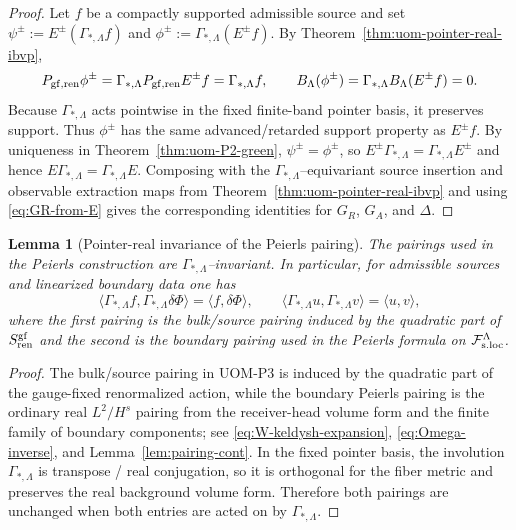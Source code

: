 \documentclass[10pt]{article}
\theoremstyle{definition}
\theoremstyle{plain}
\newtheorem{lemma}{Lemma}[section]
\begin{document}
\begin{proof}
Let $f$ be a compactly supported admissible source and set
\(
\psi^\pm:=E^\pm(\Gamma_{*,\Lambda}f)
\)
and
\(
\phi^\pm:=\Gamma_{*,\Lambda}(E^\pm f)
\).
By Theorem~\ref{thm:uom-pointer-real-ibvp},
\[
P_{\rm gf,ren}\phi^\pm
=
\Gamma_{*,\Lambda}P_{\rm gf,ren}E^\pm f
=
\Gamma_{*,\Lambda}f,
\qquad
B_\Lambda(\phi^\pm)
=
\Gamma_{*,\Lambda}B_\Lambda(E^\pm f)
=
0.
\]
Because $\Gamma_{*,\Lambda}$ acts pointwise in the fixed finite-band pointer basis, it preserves support.  Thus $\phi^\pm$ has the same
advanced/retarded support property as $E^\pm f$.  By uniqueness in Theorem~\ref{thm:uom-P2-green},
\(
\psi^\pm=\phi^\pm
\),
so
\(
E^\pm\Gamma_{*,\Lambda}=\Gamma_{*,\Lambda}E^\pm
\)
and hence
\(
E\Gamma_{*,\Lambda}=\Gamma_{*,\Lambda}E
\).
Composing with the $\Gamma_{*,\Lambda}$--equivariant source insertion and observable extraction maps from
Theorem~\ref{thm:uom-pointer-real-ibvp} and using \eqref{eq:GR-from-E} gives the corresponding identities for
$G_R$, $G_A$, and $\Delta$.
\end{proof}

\begin{lemma}[Pointer-real invariance of the Peierls pairing]
\label{lem:uom-pointer-real-pairing}
The pairings used in the Peierls construction are $\Gamma_{*,\Lambda}$--invariant.  In particular, for admissible sources and linearized
boundary data one has
\[
\langle \Gamma_{*,\Lambda}f,\Gamma_{*,\Lambda}\delta\Phi\rangle
=
\langle f,\delta\Phi\rangle,
\qquad
\langle \Gamma_{*,\Lambda}u,\Gamma_{*,\Lambda}v\rangle
=
\langle u,v\rangle,
\]
where the first pairing is the bulk/source pairing induced by the quadratic part of $S_{\rm ren}^{\rm gf}$ and the second is the boundary
pairing used in the Peierls formula on $\mathcal F_{\rm s.loc}^\Lambda$.
\end{lemma}

\begin{proof}
The bulk/source pairing in UOM-P3 is induced by the quadratic part of the gauge-fixed renormalized action, while the boundary Peierls pairing
is the ordinary real $L^2/H^s$ pairing from the receiver-head volume form and the finite family of boundary components; see
\eqref{eq:W-keldysh-expansion}, \eqref{eq:Omega-inverse}, and Lemma~\ref{lem:pairing-cont}.  In the fixed pointer basis, the involution
$\Gamma_{*,\Lambda}$ is transpose / real conjugation, so it is orthogonal for the fiber metric and preserves the real background volume form.
Therefore both pairings are unchanged when both entries are acted on by $\Gamma_{*,\Lambda}$.
\end{proof}
\end{document}
